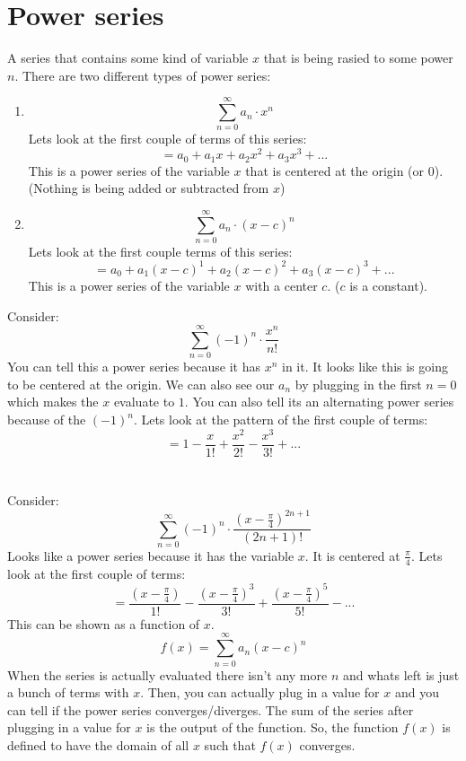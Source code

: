 \documentclass{article}
\begin{document}
\section{Power series}
    A series that contains some kind of variable \(x\) that is being rasied to some power \(n\).
    There are two different types of power series:
    \begin{enumerate}
        \item \[\sum_{n=0}^{\infty} a_n \cdot x^n\]
        Lets look at the first couple of terms of this series:
        \[= a_0 + a_1 x + a_2 x^2 + a_3 x^3 + ...\]
        This is a power series of the variable \(x\) that is centered at the origin (or 0).
        (Nothing is being added or subtracted from \(x\))
        \item \[\sum_{n = 0}^{\infty} a_n \cdot (x-c)^n \]
        Lets look at the first couple terms of this series:
        \[= a_0 + a_1 (x-c)^1 + a_2(x-c)^2 + a_3(x-c)^3 + ...\]
        This is a power series of the variable \(x\) with a center \(c\). 
        (\(c\) is a constant).
    \end{enumerate}
    Consider:
    \[\sum_{n = 0}^{\infty} (-1)^n \cdot \frac{x^n}{n!} \]
    You can tell this a power series because it has \(x^n\) in it.
    It looks like this is going to be centered at the origin.
    We can also see our \(a_n\) by plugging in the first \(n=0\) which makes the \(x\) evaluate to \(1\).
    You can also tell its an alternating power series because of the \((-1)^n\).
    Lets look at the pattern of the first couple of terms:
    \[= 1 - \frac{x}{1!} + \frac{x^2}{2!} - \frac{x^3}{3!} + ...\]\\
    \\
    Consider:
    \[\sum_{n=0}^{\infty} (-1)^n \cdot \frac{(x - \frac{\pi}{4})^{2n+1}}{(2n+1)!}\]
    Looks like a power series because it has the variable \(x\).
    It is centered at \(\frac{\pi}{4}\).
    Lets look at the first couple of terms:
    \[= \frac{(x - \frac{\pi}{4})}{1!} - \frac{(x - \frac{\pi}{4})^3}{3!} + \frac{(x - \frac{\pi}{4})^5}{5!} - ...\]
    This can be shown as a function of \(x\).
    \[f(x) = \sum_{n = 0}^{\infty} a_n (x - c)^n\]
    When the series is actually evaluated there isn't any more \(n\) and whats left is just a bunch of terms with \(x\).
    Then, you can actually plug in a value for \(x\) and you can tell if the power series converges/diverges.
    The sum of the series after plugging in a value for \(x\) is the output of the function.
    So, the function \(f(x)\) is defined to have the domain of all \(x\) such that \(f(x)\) converges.
\end{document}
